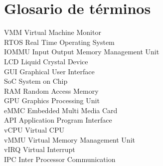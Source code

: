 \section{Glosario de términos}

VMM     Virtual Machine Monitor\\
RTOS    Real Time Operating System\\
IOMMU   Input Output Memory Management Unit\\
LCD     Liquid Crystal Device\\
GUI     Graphical User Interface\\
SoC     System on Chip\\
RAM     Random Access Memory\\
GPU     Graphics Processing Unit\\
eMMC    Embedded Multi Media Card\\
API     Application Program Interface\\
vCPU    Virtual CPU\\
vMMU    Virtual Memory Management Unit\\
vIRQ    Virtual Interrupt\\
IPC     Inter Processor Communication\\

\newpage
